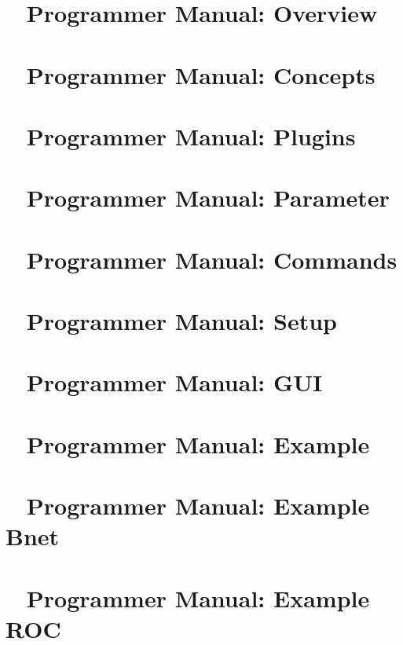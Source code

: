 
\chapter{\dabc~ Programmer Manual: Overview}
 \cleardoublepage
\chapter{\dabc~ Programmer Manual: Concepts}
 \cleardoublepage
\chapter{\dabc~ Programmer Manual: Plugins}
 \cleardoublepage
\chapter{\dabc~ Programmer Manual: Parameter}
 \cleardoublepage
\chapter{\dabc~ Programmer Manual: Commands}
 \cleardoublepage
\chapter{\dabc~ Programmer Manual: Setup}
 \cleardoublepage
\chapter{\dabc~ Programmer Manual: GUI}
 \cleardoublepage
\chapter{\dabc~ Programmer Manual: Example \mbs}
 \cleardoublepage
\chapter{\dabc~ Programmer Manual: Example Bnet}
 \cleardoublepage
\chapter{\dabc~ Programmer Manual: Example ROC}
 \cleardoublepage

